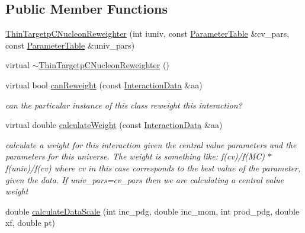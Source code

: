 \subsection*{Public Member Functions}
\begin{DoxyCompactItemize}
\item 
\hyperlink{class_neutrino_flux_reweight_1_1_thin_targetp_c_nucleon_reweighter_ae60f31bc3ac4ad48e5a32c2b64513457}{Thin\-Targetp\-C\-Nucleon\-Reweighter} (int iuniv, const \hyperlink{class_neutrino_flux_reweight_1_1_parameter_table}{Parameter\-Table} \&cv\-\_\-pars, const \hyperlink{class_neutrino_flux_reweight_1_1_parameter_table}{Parameter\-Table} \&univ\-\_\-pars)
\item 
virtual \hyperlink{class_neutrino_flux_reweight_1_1_thin_targetp_c_nucleon_reweighter_a3d6a84d222e16608b80eaaa11f9be224}{$\sim$\-Thin\-Targetp\-C\-Nucleon\-Reweighter} ()
\item 
virtual bool \hyperlink{class_neutrino_flux_reweight_1_1_thin_targetp_c_nucleon_reweighter_a974bafd329ce322beef237061f446694}{can\-Reweight} (const \hyperlink{class_neutrino_flux_reweight_1_1_interaction_data}{Interaction\-Data} \&aa)
\begin{DoxyCompactList}\small\item\em can the particular instance of this class reweight this interaction? \end{DoxyCompactList}\item 
virtual double \hyperlink{class_neutrino_flux_reweight_1_1_thin_targetp_c_nucleon_reweighter_a6bf9833d98dab84af820f05cf2ff851b}{calculate\-Weight} (const \hyperlink{class_neutrino_flux_reweight_1_1_interaction_data}{Interaction\-Data} \&aa)
\begin{DoxyCompactList}\small\item\em calculate a weight for this interaction given the central value parameters and the parameters for this universe. The weight is something like\-: f(cv)/f(M\-C) $\ast$ f(univ)/f(cv) where cv in this case corresponds to the best value of the parameter, given the data. If univ\-\_\-pars=cv\-\_\-pars then we are calculating a central value weight \end{DoxyCompactList}\item 
double \hyperlink{class_neutrino_flux_reweight_1_1_thin_targetp_c_nucleon_reweighter_a639fe43b3b14e2f1fd277dbbab71cae1}{calculate\-Data\-Scale} (int inc\-\_\-pdg, double inc\-\_\-mom, int prod\-\_\-pdg, double xf, double pt)
\end{DoxyCompactItemize}
